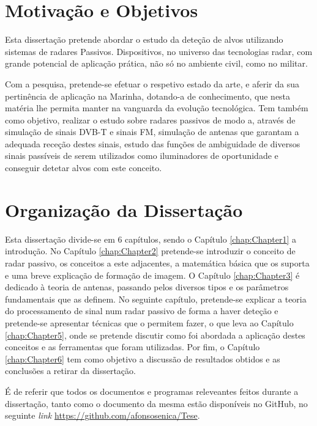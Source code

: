 \section{Motivação e Objetivos}
Esta dissertação pretende abordar o estudo da deteção de alvos utilizando sistemas de radares Passivos. Dispositivos, no universo das tecnologias radar, com grande potencial de aplicação prática, não só no ambiente civil, como no militar.\par
Com a pesquisa, pretende-se efetuar o respetivo estado da arte, e aferir da sua pertinência de aplicação na Marinha, dotando-a de conhecimento, que nesta matéria lhe permita manter na vanguarda da evolução tecnológica. Tem também como objetivo, realizar o estudo sobre radares passivos de modo a, através de simulação de sinais \gls{DVB-T} e sinais \gls{FM}, simulação de antenas que garantam a adequada receção destes sinais, estudo das funções de ambiguidade de diversos sinais passíveis de serem utilizados como iluminadores de oportunidade e conseguir detetar alvos com este conceito. 

\section{Organização da Dissertação}
Esta dissertação divide-se em 6 capítulos, sendo o Capítulo \ref{chap:Chapter1} a introdução. No Capítulo \ref{chap:Chapter2} pretende-se introduzir o conceito de radar passivo, os conceitos a este adjacentes, a matemática básica que os suporta e uma breve explicação de formação de imagem. O Capítulo \ref{chap:Chapter3} é dedicado à teoria de antenas, passando pelos diversos tipos e os parâmetros fundamentais que as definem. No seguinte capítulo, pretende-se explicar a teoria do processamento de sinal num radar passivo de forma a haver deteção e pretende-se apresentar técnicas que o permitem fazer, o que leva ao Capítulo \ref{chap:Chapter5}, onde se pretende discutir como foi abordada a aplicação destes conceitos e as ferramentas que foram utilizadas. Por fim, o Capítulo \ref{chap:Chapter6} tem como objetivo a discussão de resultados obtidos e as conclusões a retirar da dissertação.\par 
É de referir que todos os documentos e programas releveantes feitos durante a dissertação, tanto como o documento da mesma estão disponíveis no GitHub, no seguinte \textit{link} \url{https://github.com/afonsosenica/Tese}.